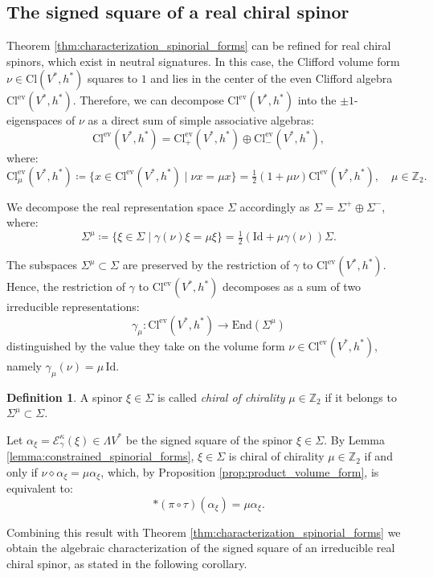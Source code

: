 \documentclass[10pt,reqno]{amsart}
\theoremstyle{definition}
\newtheorem{definition}[theorem]{Definition}
\theoremstyle{remark}
\newcommand{\Z}{\mathbb{Z}}
\newcommand{\Id}{\mathrm{Id}}
\newcommand{\End}{\mathrm{End}}
\begin{document}
\subsection{The signed square of a real chiral spinor}

Theorem \ref{thm:characterization_spinorial_forms} can be refined for real chiral spinors, which exist in neutral signatures. In this case, the Clifford volume form $\nu\in\mathrm{Cl}(V^*,h^*)$ squares to $1$ and lies in the center of the even Clifford algebra $\mathrm{Cl}^{\mathrm{ev}}(V^*,h^*)$. Therefore, we can decompose $\mathrm{Cl}^{\mathrm{ev}}(V^*,h^*)$ into the $\pm1$-eigenspaces of $\nu$ as a direct sum of simple associative algebras: $$\mathrm{Cl}^{\mathrm{ev}}(V^*,h^*)=\mathrm{Cl}^{\mathrm{ev}}_+(V^*,h^*)\oplus\mathrm{Cl}^{\mathrm{ev}}_-(V^*,h^*),$$ where: $$\mathrm{Cl}^{\mathrm{ev}}_\mu(V^*,h^*)\coloneqq\{x\in\mathrm{Cl}^{\mathrm{ev}}(V^*,h^*)\mid \nu x=\mu x\}=\tfrac{1}{2}(1+\mu\nu)\mathrm{Cl}^{\mathrm{ev}}(V^*,h^*),\quad\mu\in\Z_2.$$

We decompose the real representation space $\Sigma$ accordingly as $\Sigma=\Sigma^+\oplus\Sigma^-$, where: $$\Sigma^\mu\coloneqq\{\xi\in\Sigma\mid\gamma(\nu)\xi=\mu\xi\}=\tfrac{1}{2}(\Id+\mu\gamma(\nu))\Sigma.$$

The subspaces $\Sigma^\mu\subset\Sigma$ are preserved by the restriction of $\gamma$ to $\mathrm{Cl}^{\mathrm{ev}}(V^*,h^*)$. Hence, the restriction of $\gamma$ to $\mathrm{Cl}^{\mathrm{ev}}(V^*,h^*)$ decomposes as a sum of two irreducible representations: $$\gamma_\mu\colon\mathrm{Cl}^{\mathrm{ev}}(V^*,h^*)\to\End(\Sigma^\mu)$$ distinguished by the value they take on the volume form $\nu\in\mathrm{Cl}^{\mathrm{ev}}(V^*,h^*)$, namely $\gamma_\mu(\nu)=\mu\,\Id$.

\begin{definition}
    A spinor $\xi\in\Sigma$ is called \emph{chiral of chirality} $\mu\in\Z_2$ if it belongs to $\Sigma^\mu\subset\Sigma$.
\end{definition}

Let $\alpha_\xi=\mathcal{E}^\kappa_\gamma(\xi)\in\Lambda V^*$ be the signed square of the spinor $\xi\in\Sigma$. By Lemma \ref{lemma:constrained_spinorial_forms}, $\xi\in\Sigma$ is chiral of chirality $\mu\in\Z_2$ if and only if $\nu\diamond\alpha_\xi=\mu\alpha_\xi$, which, by Proposition \ref{prop:product_volume_form}, is equivalent to: $$*(\pi\circ\tau)(\alpha_\xi)=\mu\alpha_\xi.$$

Combining this result with Theorem \ref{thm:characterization_spinorial_forms} we obtain the algebraic characterization of the signed square of an irreducible real chiral spinor, as stated in the following corollary.
\end{document}
